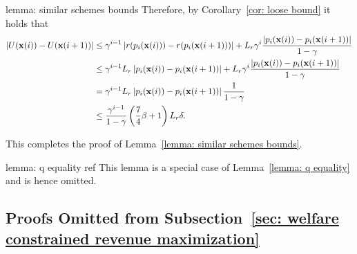 \begin{proofof}{lemma: similar schemes bounds}
Therefore, by Corollary~\ref{cor: loose bound} it holds that
\begin{align*}
\left| U({\bf{x}}(i)) - U({\bf{x}}(i+1)) \right| &\leq \gamma^{i - 1} \left| r(p_i({\bf{x}}(i))) - r(p_i({\bf{x}}(i+1))) \right| + L_r \gamma^{i} \frac{\left| p_i({\bf{x}}(i)) - p_i({\bf{x}}(i+1)) \right|}{1 - \gamma} \\
&\leq \gamma^{i - 1} L_r \left| p_i({\bf{x}}(i)) - p_i({\bf{x}}(i+1)) \right| + L_r \gamma^{i} \frac{\left| p_i({\bf{x}}(i)) - p_i({\bf{x}}(i+1)) \right|}{1 - \gamma} \\
&= \gamma^{i - 1} L_r \left| p_i({\bf{x}}(i)) - p_i({\bf{x}}(i+1)) \right| \frac{1}{1-\gamma} \\
&\leq \frac{\gamma^{i - 1}}{1-\gamma} \left(\frac{7}{4}\beta + 1\right) L_r \delta.
\end{align*}

This completes the proof of Lemma~\ref{lemma: similar schemes bounds}.
\end{proofof}

\begin{proofof}{lemma: q equality ref}
This lemma is a special case of Lemma~\ref{lemma: q equality} and is hence omitted. 
\end{proofof}






\subsection{Proofs Omitted from Subsection~\ref{sec: welfare constrained revenue maximization}}\label{sec:appendix of constrain}


